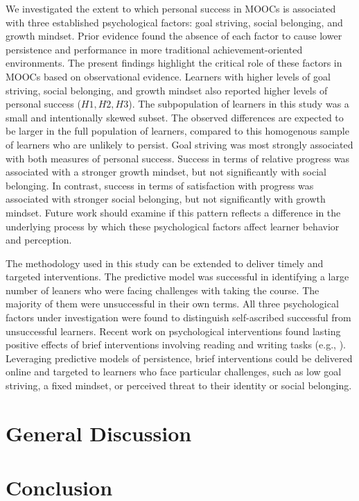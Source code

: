 \documentclass{sigchi}\usepackage[]{graphicx}\usepackage[]{color}
\begin{document}
We investigated the extent to which personal success in MOOCs is associated with three established psychological factors: goal striving, social belonging, and growth mindset. Prior evidence found the absence of each factor to cause lower persistence and performance in more traditional achievement-oriented environments. The present findings highlight the critical role of these factors in MOOCs based on observational evidence. Learners with higher levels of goal striving, social belonging, and growth mindset also reported higher levels of personal success ($H1,H2,H3$). The subpopulation of learners in this study was a small and intentionally skewed subset. The observed differences are expected to be larger in the full population of learners, compared to this homogenous sample of learners who are unlikely to persist. Goal striving was most strongly associated with both measures of personal success. Success in terms of relative progress was associated with a stronger growth mindset, but not significantly with social belonging. In contrast, success in terms of satisfaction with progress was associated with stronger social belonging, but not significantly with growth mindset. Future work should examine if this pattern reflects a difference in the underlying process by which these psychological factors affect learner behavior and perception.

The methodology used in this study can be extended to deliver timely and targeted interventions. The predictive model was successful in identifying a large number of leaners who were facing challenges with taking the course. The majority of them were unsuccessful in their own terms. All three psychological factors under investigation were found to distinguish self-ascribed successful from unsuccessful learners. Recent work on psychological interventions found lasting positive effects of brief interventions involving reading and writing tasks (e.g., \cite{walton2007question}).  Leveraging predictive models of persistence, brief interventions could be delivered online and targeted to learners who face particular challenges, such as low goal striving, a fixed mindset, or perceived threat to their identity or social belonging. 
 
\section{General Discussion}


\section{Conclusion}
\end{document}
